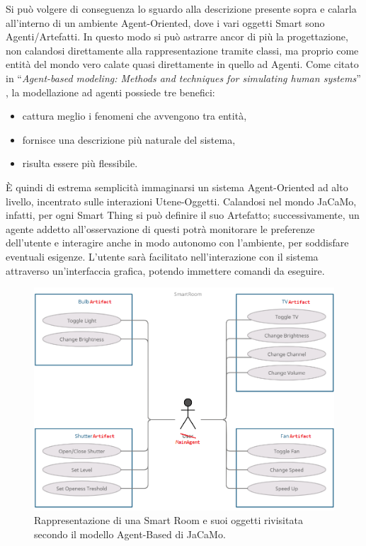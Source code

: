 \documentclass[12pt,a4paper,openright,oneside]{report}
\newcommand{\quotes}[1]{``#1''}
\begin{document}
Si può volgere di conseguenza lo sguardo alla descrizione presente sopra e calarla all'interno di un ambiente Agent-Oriented, dove i vari oggetti Smart sono Agenti/Artefatti. In questo modo si può astrarre ancor di più la progettazione, non calandosi direttamente alla rappresentazione tramite classi, ma proprio come entità del mondo vero calate quasi direttamente in quello ad Agenti. Come citato in \quotes{\textit{Agent-based modeling: Methods and techniques for simulating human systems}} \cite{abm}, la modellazione ad agenti possiede tre benefici:

\begin{itemize}
	\itemsep0em 
	\item cattura meglio i fenomeni che avvengono tra entità,
	\item fornisce una descrizione più naturale del sistema,
	\item risulta essere più flessibile.
\end{itemize}

È quindi di estrema semplicità immaginarsi un sistema Agent-Oriented ad alto livello, incentrato sulle interazioni Utene-Oggetti. Calandosi nel mondo JaCaMo, infatti, per ogni Smart Thing si può definire il suo Artefatto; successivamente, un agente addetto all'osservazione di questi potrà monitorare le preferenze dell'utente e interagire anche in modo autonomo con l'ambiente, per soddisfare eventuali esigenze. L'utente sarà facilitato nell'interazione con il sistema attraverso un'interfaccia grafica, potendo immettere comandi da eseguire.

\begin{figure}[h]
	\centering
	\includegraphics[scale=0.5]{eps/use-case-jacamo.png}
	\caption{Rappresentazione di una Smart Room e suoi oggetti rivisitata secondo il modello Agent-Based di JaCaMo.}
	\label{fig:use-case-diagram-high-agent}
\end{figure}
\end{document}
